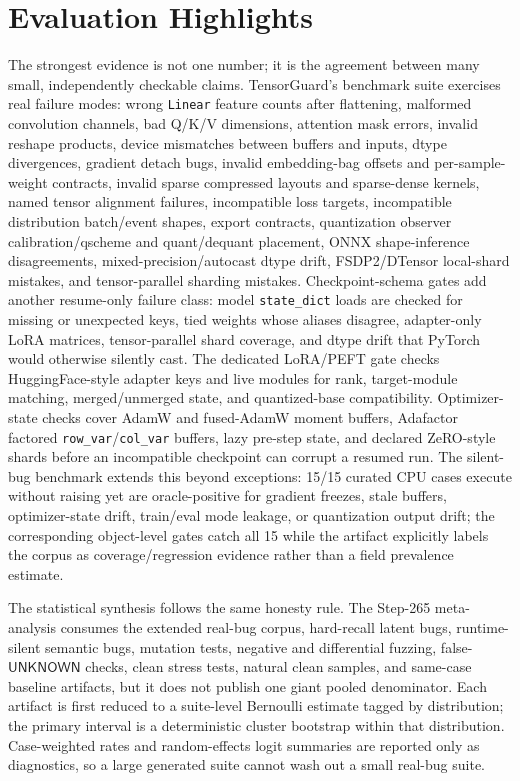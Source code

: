 \documentclass[11pt]{article}
\newcommand{\tg}{TensorGuard}
\newcommand{\unknown}{\ensuremath{\mathsf{UNKNOWN}}}
\begin{document}
\clearpage

\section{Evaluation Highlights}

The strongest evidence is not one number; it is the agreement between many
small, independently checkable claims.  \tg{}'s benchmark suite exercises real
failure modes: wrong \texttt{Linear} feature counts after flattening, malformed
convolution channels, bad Q/K/V dimensions, attention mask errors, invalid
reshape products, device mismatches between buffers and inputs, dtype
divergences, gradient detach bugs, invalid embedding-bag offsets and
per-sample-weight contracts, invalid sparse compressed layouts and
sparse-dense kernels, named
tensor alignment failures, incompatible loss targets, incompatible distribution
batch/event shapes, export
contracts, quantization observer calibration/qscheme and quant/dequant placement,
ONNX shape-inference disagreements, mixed-precision/autocast dtype drift,
FSDP2/DTensor local-shard mistakes, and tensor-parallel sharding mistakes.
Checkpoint-schema gates add another resume-only failure class: model
\texttt{state\_dict} loads are checked for missing or unexpected keys, tied
weights whose aliases disagree, adapter-only LoRA matrices, tensor-parallel
shard coverage, and dtype drift that PyTorch would otherwise silently cast.
The dedicated LoRA/PEFT gate checks HuggingFace-style adapter keys and live
modules for rank, target-module matching, merged/unmerged state, and
quantized-base compatibility.  Optimizer-state checks cover AdamW and fused-AdamW moment
buffers, Adafactor factored \texttt{row\_var}/\texttt{col\_var} buffers, lazy
pre-step state, and declared ZeRO-style shards before an incompatible checkpoint
can corrupt a resumed run.
The silent-bug benchmark extends this beyond exceptions: 15/15 curated CPU cases
execute without raising yet are oracle-positive for gradient freezes, stale
buffers, optimizer-state drift, train/eval mode leakage, or quantization output
drift; the corresponding object-level gates catch all 15 while the artifact
explicitly labels the corpus as coverage/regression evidence rather than a field
prevalence estimate.

The statistical synthesis follows the same honesty rule.  The Step-265
meta-analysis consumes the extended real-bug corpus, hard-recall latent bugs,
runtime-silent semantic bugs, mutation tests, negative and differential fuzzing,
false-\unknown{} checks, clean stress tests, natural clean samples, and same-case
baseline artifacts, but it does not publish one giant pooled denominator.  Each
artifact is first reduced to a suite-level Bernoulli estimate tagged by
distribution; the primary interval is a deterministic cluster bootstrap within
that distribution.  Case-weighted rates and random-effects logit summaries are
reported only as diagnostics, so a large generated suite cannot wash out a small
real-bug suite.
\end{document}
